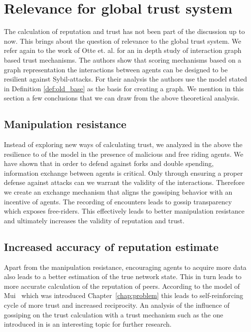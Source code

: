 \section{Relevance for global trust system}
\label{sec:relevance}
The calculation of reputation and trust has not been part of the discussion up to now.
This brings about the question of relevance to the global trust system. We refer again to the work
of Otte et. al. \cite{OTTE2017} for an in depth study of interaction graph based trust mechanisms.
The authors show that scoring mechanisms based on a graph representation the interactions between 
agents can be designed to be resilient against Sybil-attacks. For their analysis the authors use the
model stated in Definition \ref{def:old_base} as the basis for creating a graph. We mention in this
section a few conclusions that we can draw from the above theoretical analysis.

\subsection{Manipulation resistance}
Instead of exploring new ways of calculating trust, we analyzed in the above the resilience to of 
the model in the presence of malicious and free riding agents. We have shown that in order to defend
against forks and double spending, information exchange between agents is critical. Only through
ensuring a proper defense against attacks can we warrant the validity of the interactions. Therefore
we create an exchange mechanism that aligns the gossiping behavior with an incentive of agents. The
recording of encounters leads to gossip transparency which exposes free-riders. This effectively 
leads to better manipulation resistance and ultimately increases the validity of reputation and 
trust.

\subsection{Increased accuracy of reputation estimate}
Apart from the manipulation resistance, encouraging agents to acquire more data also leads to a
better estimation of the true network state. This in turn leads to more accurate calculation of 
the reputation of peers. According to the model of Mui~\cite{mui2002computational} which was 
introduced Chapter~\ref{chap:problem} this leads to self-reinforcing cycle of more trust and 
increased reciprocity. An analysis of the influence of gossiping on the trust calculation with a
trust mechanism such as the one introduced in \cite{OTTE2017} is an interesting topic for further 
research.

